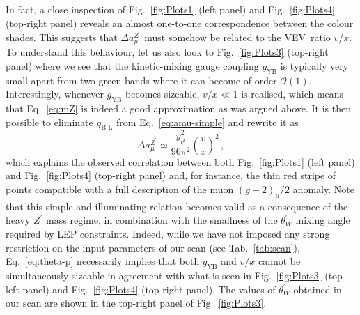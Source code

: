 \documentclass[a4paper,11pt]{article}
\newcommand{\vev}[0]{VEV}
\renewcommand{\(}{\left(}
\renewcommand{\)}{\right)}
\renewcommand{\[}{\left[}
\renewcommand{\]}{\right]}
\newcommand{\ro}[1]{\textrm{#1}}
\begin{document}
In fact, a close inspection of Fig.~\ref{fig:Plots1} (left panel) and Fig.~\ref{fig:Plots4} (top-right panel) reveals an almost one-to-one correspondence between the colour shades. This suggests that $\Delta a_\mu^{Z^\prime}$ must somehow be related to the \vev~ratio $v/x$. To understand this behaviour, let us also look to Fig.~\ref{fig:Plots3} (top-right panel) where we see that the kinetic-mixing gauge coupling $g_\ro{YB}$ is typically very small apart from two green bands where it can become of order $\mathcal{O}(1)$. Interestingly, whenever $g_\ro{YB}$ becomes sizeable, $v/x \ll 1$ is realised, which means that Eq.~\eqref{eq:mZ} is indeed a good approximation as was argued above. It is then possible to eliminate $g_\ro{B-L}$ from Eq.~\eqref{eq:amu-simple} and rewrite it as
\begin{equation}
    \Delta a_\mu^{Z^\prime} \simeq \dfrac{y_\mu^2}{96 \pi^2} \(\dfrac{v}{x}\)^2 \,,
    \label{eq:amu-vev}
\end{equation}
which explains the observed correlation between both Fig.~\ref{fig:Plots1} (left panel) and Fig.~\ref{fig:Plots4} (top-right panel) and, for instance, the thin red stripe of points compatible with a full description of the muon $\(g-2\)_\mu/2$ anomaly. Note that this simple and illuminating relation becomes valid as a consequence of the heavy $Z^\prime$ mass regime, in combination with the smallness of the $\theta_W^\prime$ mixing angle required by LEP constraints. Indeed, while we have not imposed any strong restriction on the input parameters of our scan (see Tab.~\ref{tab:scan}), Eq.~\eqref{eq:theta-p} necessarily implies that both $g_\ro{YB}$ and $v/x$ cannot be simultaneously sizeable in agreement with what is seen in Fig.~\ref{fig:Plots3} (top-left panel) and Fig.~\ref{fig:Plots4} (top-right panel). The values of $\theta_W^\prime$ obtained in our scan are shown in the top-right panel of Fig.~\ref{fig:Plots3}.
\end{document}
